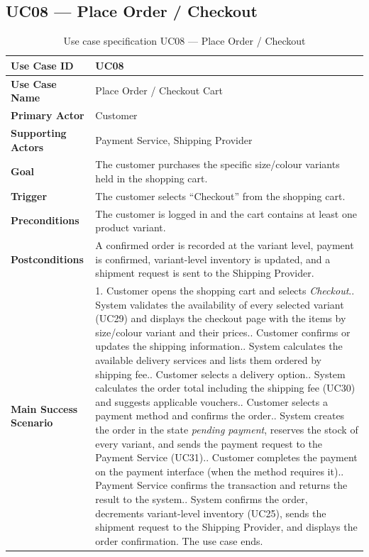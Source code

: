 \documentclass[11pt,a4paper,oneside]{extreport}
\newcommand{\ucrow}[2]{\textbf{#1} & #2 \\ \midrule}
\begin{document}
\subsection{UC08 --- Place Order / Checkout}
{\small
\begin{xltabular}{\textwidth}{@{}L{3.1cm} Y@{}}
\caption{Use case specification UC08 --- Place Order / Checkout}\label{tab:uc08}\\
\toprule
\endfirsthead
\toprule
\endhead
\bottomrule
\endlastfoot
\ucrow{Use Case ID}{UC08}
\ucrow{Use Case Name}{Place Order / Checkout Cart}
\ucrow{Primary Actor}{Customer}
\ucrow{Supporting Actors}{Payment Service, Shipping Provider}
\ucrow{Goal}{The customer purchases the specific size/colour variants held in the shopping cart.}
\ucrow{Trigger}{The customer selects ``Checkout'' from the shopping cart.}
\ucrow{Preconditions}{The customer is logged in and the cart contains at least one product variant.}
\ucrow{Postconditions}{A confirmed order is recorded at the variant level, payment is confirmed, variant-level inventory is updated, and a shipment request is sent to the Shipping Provider.}
\ucrow{Main Success Scenario}{%
1. Customer opens the shopping cart and selects \emph{Checkout}.\newline
2. System validates the availability of every selected variant (UC29) and displays the checkout page with the items by size/colour variant and their prices.\newline
3. Customer confirms or updates the shipping information.\newline
4. System calculates the available delivery services and lists them ordered by shipping fee.\newline
5. Customer selects a delivery option.\newline
6. System calculates the order total including the shipping fee (UC30) and suggests applicable vouchers.\newline
7. Customer selects a payment method and confirms the order.\newline
8. System creates the order in the state \emph{pending payment}, reserves the stock of every variant, and sends the payment request to the Payment Service (UC31).\newline
9. Customer completes the payment on the payment interface (when the method requires it).\newline
10. Payment Service confirms the transaction and returns the result to the system.\newline
11. System confirms the order, decrements variant-level inventory (UC25), sends the shipment request to the Shipping Provider, and displays the order confirmation. The use case ends.}

\end{xltabular}}
\end{document}
